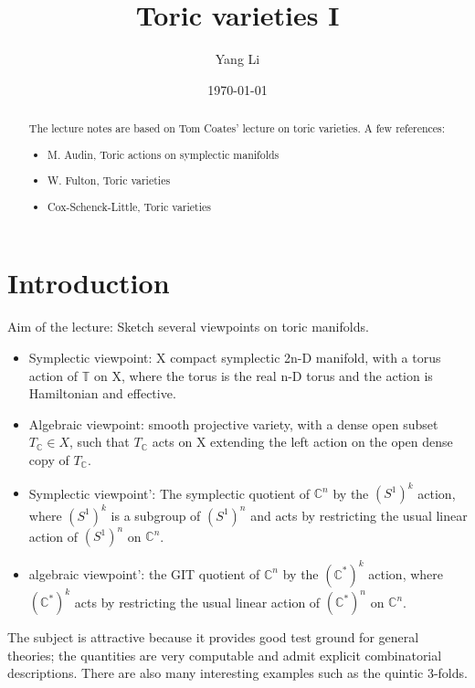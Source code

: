 \documentclass[a4paper]{article}
\title{Toric varieties I}
\author{Yang Li}
\date{\today}
\newcommand{\C}{\mathbb{C}}
\newcommand{\T}{\mathbb{T}}
\begin{document}
	\maketitle
	
	\begin{abstract}
		The lecture notes are based on Tom Coates' lecture on toric varieties. A few references:
		
		\begin{itemize}
			\item M. Audin, Toric actions on symplectic manifolds
			\item W. Fulton, Toric varieties
			\item Cox-Schenck-Little, Toric varieties
		\end{itemize}
	\end{abstract}
	
	\section{Introduction}
	
	
	Aim of the lecture: Sketch several viewpoints on toric manifolds.
	
	\begin{itemize}
		\item Symplectic viewpoint: X compact symplectic 2n-D manifold, with a torus action of $\T$ on X, where the torus is the real n-D torus and the action is Hamiltonian and effective.
		\item Algebraic viewpoint: smooth projective variety, with a dense open subset $T_{\C} \in X$, such that $T_{\C}$ acts on X extending the left action on the open dense copy of $T_{\C}$.
		\item Symplectic viewpoint': The symplectic quotient of $\C^{n}$ by the $(S^{1})^{k}$ action, where $(S^{1})^{k}$ is a subgroup of $(S^{1})^{n}$ and acts by restricting the usual linear action of $(S^{1})^{n}$ on $\C^{n}$.
		\item algebraic viewpoint': the GIT quotient of $\C^{n}$ by the $(\C^{*})^{k}$ action, where $(\C^{*})^{k}$ acts by restricting the usual linear action of $(\C^{*})^{n}$ on $\C^{n}$.
		
	\end{itemize}
	
	
	The subject is attractive because it provides good test ground for general theories; the quantities are very computable and admit explicit combinatorial descriptions. There are also many interesting examples such as the quintic 3-folds.
	
\end{document}
